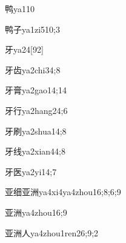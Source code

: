\begin{verbete}{鸭}{ya1}{10}
\end{verbete}

\begin{verbete}{鸭子}{ya1zi5}{10;3}
\end{verbete}

\begin{verbete}{牙}{ya2}{4}[92]
\end{verbete}

\begin{verbete}{牙齿}{ya2chi3}{4;8}
\end{verbete}

\begin{verbete}{牙膏}{ya2gao1}{4;14}
\end{verbete}

\begin{verbete}{牙行}{ya2hang2}{4;6}
\end{verbete}

\begin{verbete}{牙刷}{ya2shua1}{4;8}
\end{verbete}

\begin{verbete}{牙线}{ya2xian4}{4;8}
\end{verbete}

\begin{verbete}{牙医}{ya2yi1}{4;7}
\end{verbete}

\begin{verbete}{亚细亚洲}{ya4xi4ya4zhou1}{6;8;6;9}
\end{verbete}

\begin{verbete}{亚洲}{ya4zhou1}{6;9}
\end{verbete}

\begin{verbete}{亚洲人}{ya4zhou1ren2}{6;9;2}
\end{verbete}

